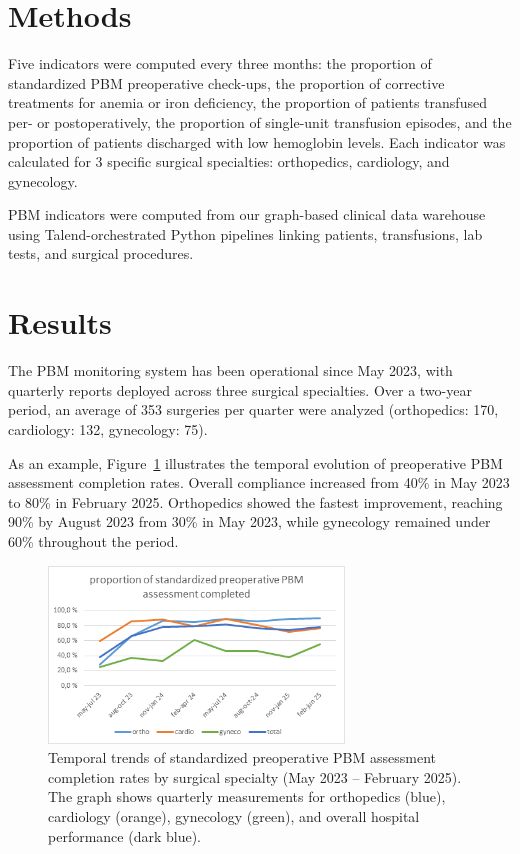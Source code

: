 \documentclass{IOS-Book-Article}
\begin{document}
\section{Methods}

Five indicators were computed every three months: the proportion of standardized PBM preoperative check-ups,
 the proportion of corrective treatments for anemia or iron deficiency, the proportion of patients 
 transfused per- or postoperatively, the proportion of single-unit transfusion episodes, and the 
 proportion of patients discharged with low hemoglobin levels. Each indicator was calculated for 3 
 specific surgical specialties: orthopedics, cardiology, and gynecology. 

PBM indicators were computed from our graph-based clinical data warehouse \cite{Artemova2019}
using Talend-orchestrated Python pipelines linking patients, transfusions, lab tests, and surgical 
procedures.

\section{Results}

The PBM monitoring system has been operational since May 2023, with quarterly 
reports deployed across three surgical specialties. Over a two-year period, an 
average of 353 surgeries per quarter were analyzed (orthopedics: 170, 
cardiology: 132, gynecology: 75).

As an example, Figure~\ref{fig:pbm_trends} illustrates the temporal evolution of preoperative 
PBM assessment completion rates. Overall compliance increased from 40\% in May 
2023 to 80\% in February 2025. Orthopedics showed the fastest improvement, 
reaching 90\% by August 2023 from 30\% in May 2023, while gynecology remained under
60\% throughout the period.

\begin{figure}[h!]
\centering
\includegraphics[width=0.7\textwidth]{figure.png}
\caption{Temporal trends of standardized preoperative PBM assessment completion rates by surgical specialty (May 2023 -- February 2025). The graph shows quarterly measurements for orthopedics (blue), cardiology (orange), gynecology (green), and overall hospital performance (dark blue).}
\label{fig:pbm_trends}
\vspace{-1em}
\end{figure}
\end{document}
